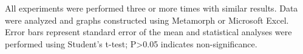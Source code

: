 All experiments were performed three or more times with similar results.
Data were analyzed and graphs constructed using Metamorph or Microsoft Excel.
Error bars represent standard error of the mean and statistical analyses were performed using Student’s t-test; P>0.05 indicates non-significance.